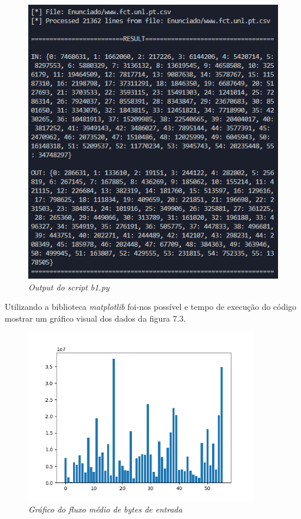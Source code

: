\begin{figure}[h!]
    \label{high}
    \centering
    \includegraphics[width=1\textwidth]{Images/b1/b1_a.png}
    \caption{\textit{Output do script b1.py}}
\end{figure}

Utilizando a biblioteca \textit{matplotlib} \cite{MAT} foi-nos possível e tempo de execução do código mostrar um gráfico visual dos dados da figura 7.3.

\begin{figure}[h!]
    \label{high}
    \centering
    \includegraphics[width=0.9\textwidth]{Images/b1/b1_1.png}
    \caption{\textit{Gráfico do fluxo médio de bytes de entrada}}
\end{figure}

